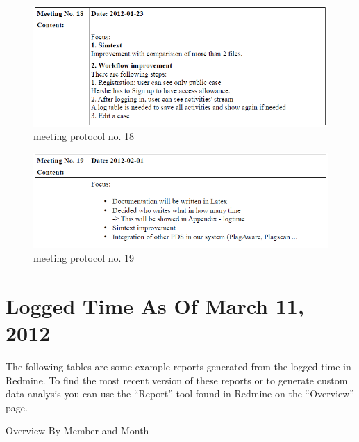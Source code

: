 \begin{appendix}
\begin{figure}[htbp]
  \centering
    \includegraphics[width=\textwidth]{images/a_meetings/meeting_18}
  \caption{meeting protocol no. 18}
  \label{fig:meeting protocol no. 18}
\end{figure}

\begin{figure}[htbp]
  \centering
    \includegraphics[width=\textwidth]{images/a_meetings/meeting_19}
  \caption{meeting protocol no. 19}
  \label{fig:meeting protocol no. 19}
\end{figure}



\chapter{Logged Time As Of March 11, 2012}

The following tables are some example reports generated from the logged time in Redmine. To find the most recent version
of these reports or to generate custom data analysis you can use the \enquote{Report} tool found in Redmine on the \enquote{Overview}
page.


\begin{table}[htbp]
  \caption{Overview By Member and Month}
  \centering
\end{table}


\end{appendix}
